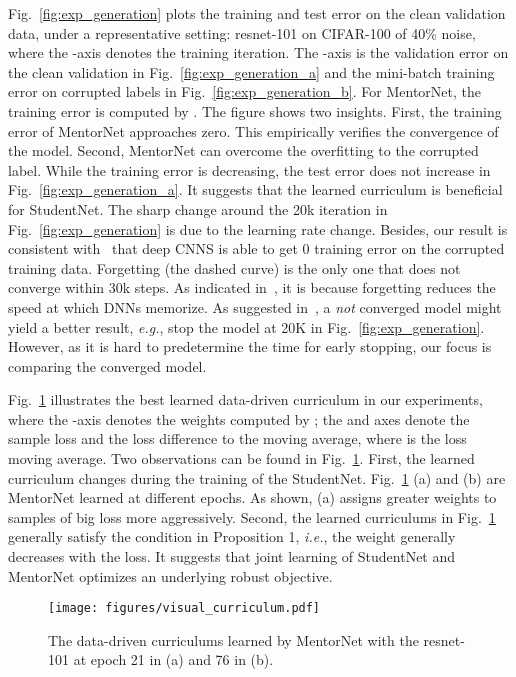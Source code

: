 \documentclass{article}
\newcommand{\eg}{\emph{e.g.}} \newcommand{\Eg}{\emph{E.g}}
\newcommand{\ie}{\emph{i.e.}} \newcommand{\Ie}{\emph{I.e}}
\begin{document}
Fig.~\ref{fig:exp_generation} plots the training and test error on the clean validation data, under a representative setting: resnet-101 on CIFAR-100 of 40\% noise, where the -axis denotes the training iteration. The -axis is the validation error on the clean validation in Fig.~\ref{fig:exp_generation_a} and the mini-batch training error on corrupted labels in Fig.~\ref{fig:exp_generation_b}. For MentorNet, the training error is computed by . The figure shows two insights. First, the training error of MentorNet approaches zero. This empirically verifies the convergence of the model. Second, MentorNet can overcome the overfitting to the corrupted label. While the training error is decreasing, the test error does not increase in Fig.~\ref{fig:exp_generation_a}. It suggests that the learned curriculum is beneficial for StudentNet. The sharp change around the 20k iteration in Fig.~\ref{fig:exp_generation} is due to the learning rate change. Besides, our result is consistent with~\cite{zhang2017understanding} that deep CNNS is able to get 0 training error on the corrupted training data. Forgetting (the dashed curve) is the only one that does not converge within 30k steps. As indicated in~\cite{arpit2017closer}, it is because forgetting reduces the speed at which DNNs memorize. As suggested in~\cite{zhang2017mixup}, a \emph{not} converged model might yield a better result, \eg, stop the model at 20K in Fig.~\ref{fig:exp_generation}. However, as it is hard to predetermine the time for early stopping, our focus is comparing the converged model. 


Fig.~\ref{fig:visual_curriculum} illustrates the best learned data-driven curriculum in our experiments, where the -axis denotes the weights computed by ; the  and  axes denote the sample loss and the loss difference to the moving average, where  is the loss moving average. Two observations can be found in Fig.~\ref{fig:visual_curriculum}. First, the learned curriculum changes during the training of the StudentNet. Fig.~\ref{fig:visual_curriculum} (a) and (b) are MentorNet learned at different epochs. As shown, (a) assigns greater weights to samples of big loss more aggressively. Second, the learned curriculums in Fig.~\ref{fig:visual_curriculum} generally satisfy the condition in Proposition 1, \ie, the weight generally decreases with the loss. It suggests that joint learning of StudentNet and MentorNet optimizes an underlying robust objective.

\begin{figure}[ht]
\vspace{-1mm}
\texttt{[image: figures/visual\_curriculum.pdf]}
\vspace{-6mm}
\caption{\label{fig:visual_curriculum} The data-driven curriculums learned by MentorNet with the resnet-101 at epoch 21 in (a) and 76 in (b).}
\vspace{-5mm}
\end{figure}
\end{document}
